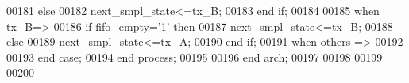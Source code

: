 \begin{DoxyCode}
00181           \textcolor{keywordflow}{else}
00182               \textcolor{vhdlchar}{next_smpl_state}\textcolor{vhdlchar}{<=}\textcolor{vhdlchar}{tx\_B};
00183           \textcolor{keywordflow}{end} \textcolor{keywordflow}{if};
00184           
00185       \textcolor{keywordflow}{when} \textcolor{vhdlchar}{tx\_B}\textcolor{vhdlchar}{=}\textcolor{vhdlchar}{>} 
00186           \textcolor{keywordflow}{if} \textcolor{vhdlchar}{fifo_empty}\textcolor{vhdlchar}{=}\textcolor{vhdlchar}{'}\textcolor{vhdllogic}{}\textcolor{vhdllogic}{1}\textcolor{vhdlchar}{'} \textcolor{keywordflow}{then}
00187               \textcolor{vhdlchar}{next_smpl_state}\textcolor{vhdlchar}{<=}\textcolor{vhdlchar}{tx\_B};
00188           \textcolor{keywordflow}{else}
00189               \textcolor{vhdlchar}{next_smpl_state}\textcolor{vhdlchar}{<=}\textcolor{vhdlchar}{tx\_A};
00190           \textcolor{keywordflow}{end} \textcolor{keywordflow}{if};  
00191       \textcolor{keywordflow}{when} \textcolor{keywordflow}{others} \textcolor{vhdlchar}{=}\textcolor{vhdlchar}{>} 
00192         
00193       \textcolor{keywordflow}{end} \textcolor{keywordflow}{case};
00194 \textcolor{keywordflow}{end} \textcolor{keywordflow}{process}; 
00195   
00196 \textcolor{keywordflow}{end} \textcolor{vhdlchar}{arch};
00197 
00198 
00199 
00200 
\end{DoxyCode}
